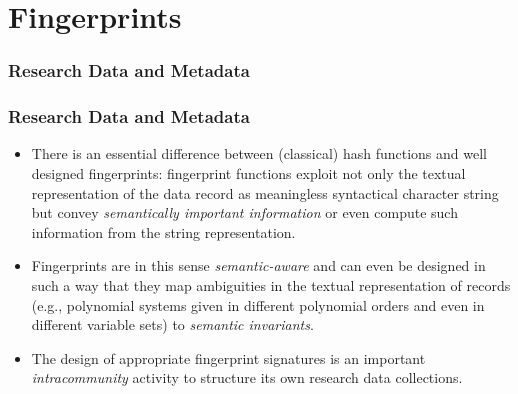 \documentclass{beamer}
\begin{document}
\section{Fingerprints}
\begin{frame}\frametitle{Research Data and Metadata}
\end{frame}

\begin{frame}\frametitle{Research Data and Metadata}
  \begin{itemize}
  \item There is an essential difference between (classical) hash functions and
    well designed fingerprints: fingerprint functions exploit not only the
    textual representation of the data record as meaningless syntactical
    character string but convey \emph{semantically important information} or
    even compute such information from the string representation.
  \item Fingerprints are in this sense \emph{semantic-aware} and can even be
    designed in such a way that they map ambiguities in the textual
    representation of records (e.g., polynomial systems given in different
    polynomial orders and even in different variable sets) to \emph{semantic
      invariants}.
  \item The design of appropriate fingerprint signatures is an important
    \emph{intracommunity} activity to structure its own research data
    collections.
  \end{itemize}
\end{frame}
\end{document}
